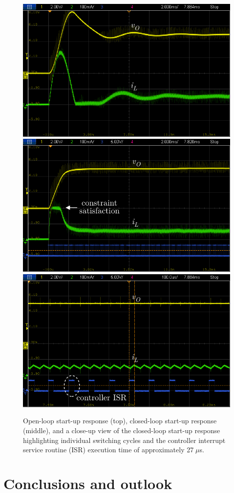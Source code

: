 \begin{figure}[p] 
	\vspace{35pt}
	\centering
	\includegraphics[width=0.65\linewidth]{../images/chap4_scope_ol} \\[10pt]
	\includegraphics[width=0.65\linewidth]{../images/chap4_scope_cl1} \\[10pt]
	\includegraphics[width=0.65\linewidth]{../images/chap4_scope_cl2} \\[10pt]
	\caption{Open-loop start-up response (top), closed-loop start-up response (middle), and a close-up view of the closed-loop start-up response highlighting individual switching cycles and the controller interrupt service routine (ISR) execution time of approximately 27$\;\mu$s.}
	\label{fig.buck_exp_res}
\end{figure}

\section{Conclusions and outlook}

